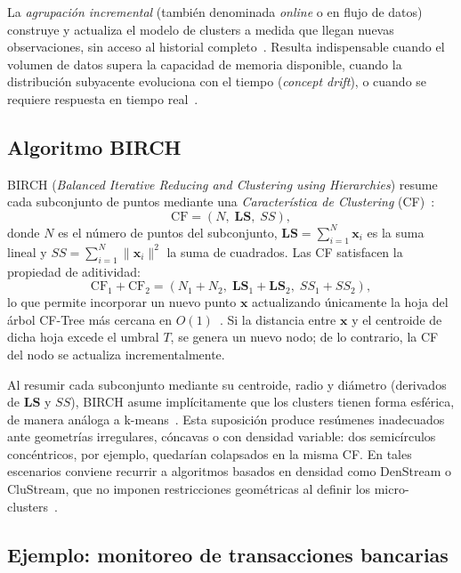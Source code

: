 La \emph{agrupación incremental} (también denominada \textit{online} o en flujo de datos) construye y actualiza el modelo de clusters a medida que llegan nuevas observaciones, sin acceso al historial completo~\cite{gama2014survey}. Resulta indispensable cuando el volumen de datos supera la capacidad de memoria disponible, cuando la distribución subyacente evoluciona con el tiempo (\textit{concept drift}), o cuando se requiere respuesta en tiempo real~\cite{gama2014survey}.

\subsection{Algoritmo BIRCH}

BIRCH (\textit{Balanced Iterative Reducing and Clustering using Hierarchies}) resume cada subconjunto de puntos mediante una \emph{Característica de Clustering} (CF)~\cite{zhang1996birch}:
\[
\mathrm{CF} = (N,\;\mathbf{LS},\;SS),
\]
donde $N$ es el número de puntos del subconjunto, $\mathbf{LS} = \sum_{i=1}^{N} \mathbf{x}_i$ es la suma lineal y $SS = \sum_{i=1}^{N}\|\mathbf{x}_i\|^2$ la suma de cuadrados. Las CF satisfacen la propiedad de aditividad:
\[
\mathrm{CF}_1 + \mathrm{CF}_2 = (N_1+N_2,\;\mathbf{LS}_1+\mathbf{LS}_2,\;SS_1+SS_2),
\]
lo que permite incorporar un nuevo punto $\mathbf{x}$ actualizando únicamente la hoja del árbol CF-Tree más cercana en $O(1)$~\cite{zhang1996birch}. Si la distancia entre $\mathbf{x}$ y el centroide de dicha hoja excede el umbral $T$, se genera un nuevo nodo; de lo contrario, la CF del nodo se actualiza incrementalmente.

\begin{remark}
Al resumir cada subconjunto mediante su centroide, radio y diámetro (derivados de $\mathbf{LS}$ y $SS$), BIRCH asume implícitamente que los clusters tienen forma esférica, de manera análoga a k-means~\cite{zhang1996birch}. Esta suposición produce resúmenes inadecuados ante geometrías irregulares, cóncavas o con densidad variable: dos semicírculos concéntricos, por ejemplo, quedarían colapsados en la misma CF. En tales escenarios conviene recurrir a algoritmos basados en densidad como DenStream o CluStream, que no imponen restricciones geométricas al definir los micro-clusters~\cite{gama2014survey}.
\end{remark}

\subsection{Ejemplo: monitoreo de transacciones bancarias}

